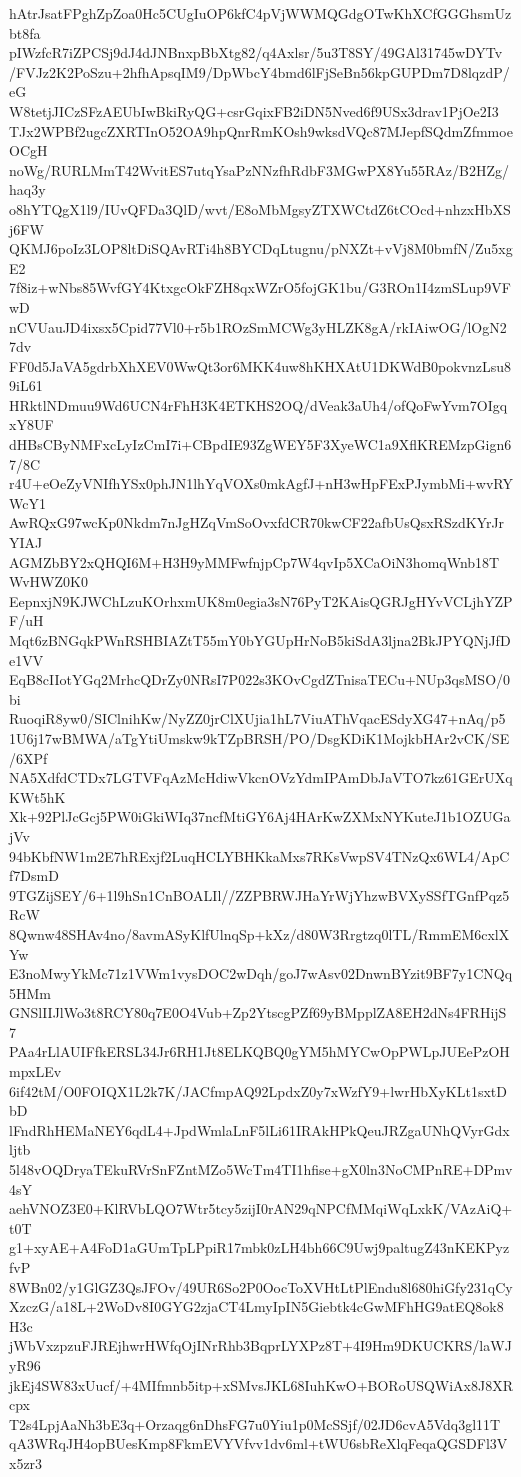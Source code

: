 hAtrJsatFPghZpZoa0Hc5CUgIuOP6kfC4pVjWWMQGdgOTwKhXCfGGGhsmUzbt8fa
pIWzfcR7iZPCSj9dJ4dJNBnxpBbXtg82/q4Axlsr/5u3T8SY/49GAl31745wDYTv
/FVJz2K2PoSzu+2hfhApsqIM9/DpWbcY4bmd6lFjSeBn56kpGUPDm7D8lqzdP/eG
W8tetjJICzSFzAEUbIwBkiRyQG+csrGqixFB2iDN5Nved6f9USx3drav1PjOe2I3
TJx2WPBf2ugcZXRTInO52OA9hpQnrRmKOsh9wksdVQc87MJepfSQdmZfmmoeOCgH
noWg/RURLMmT42WvitES7utqYsaPzNNzfhRdbF3MGwPX8Yu55RAz/B2HZg/haq3y
o8hYTQgX1l9/IUvQFDa3QlD/wvt/E8oMbMgsyZTXWCtdZ6tCOcd+nhzxHbXSj6FW
QKMJ6poIz3LOP8ltDiSQAvRTi4h8BYCDqLtugnu/pNXZt+vVj8M0bmfN/Zu5xgE2
7f8iz+wNbs85WvfGY4KtxgcOkFZH8qxWZrO5fojGK1bu/G3ROn1I4zmSLup9VFwD
nCVUauJD4ixsx5Cpid77Vl0+r5b1ROzSmMCWg3yHLZK8gA/rkIAiwOG/lOgN27dv
FF0d5JaVA5gdrbXhXEV0WwQt3or6MKK4uw8hKHXAtU1DKWdB0pokvnzLsu89iL61
HRktlNDmuu9Wd6UCN4rFhH3K4ETKHS2OQ/dVeak3aUh4/ofQoFwYvm7OIgqxY8UF
dHBsCByNMFxcLyIzCmI7i+CBpdIE93ZgWEY5F3XyeWC1a9XflKREMzpGign67/8C
r4U+eOeZyVNIfhYSx0phJN1lhYqVOXs0mkAgfJ+nH3wHpFExPJymbMi+wvRYWcY1
AwRQxG97wcKp0Nkdm7nJgHZqVmSoOvxfdCR70kwCF22afbUsQsxRSzdKYrJrYIAJ
AGMZbBY2xQHQI6M+H3H9yMMFwfnjpCp7W4qvIp5XCaOiN3homqWnb18TWvHWZ0K0
EepnxjN9KJWChLzuKOrhxmUK8m0egia3sN76PyT2KAisQGRJgHYvVCLjhYZPF/uH
Mqt6zBNGqkPWnRSHBIAZtT55mY0bYGUpHrNoB5kiSdA3ljna2BkJPYQNjJfDe1VV
EqB8cIIotYGq2MrhcQDrZy0NRsI7P022s3KOvCgdZTnisaTECu+NUp3qsMSO/0bi
RuoqiR8yw0/SIClnihKw/NyZZ0jrClXUjia1hL7ViuAThVqacESdyXG47+nAq/p5
1U6j17wBMWA/aTgYtiUmskw9kTZpBRSH/PO/DsgKDiK1MojkbHAr2vCK/SE/6XPf
NA5XdfdCTDx7LGTVFqAzMcHdiwVkcnOVzYdmIPAmDbJaVTO7kz61GErUXqKWt5hK
Xk+92PlJcGcj5PW0iGkiWIq37ncfMtiGY6Aj4HArKwZXMxNYKuteJ1b1OZUGajVv
94bKbfNW1m2E7hRExjf2LuqHCLYBHKkaMxs7RKsVwpSV4TNzQx6WL4/ApCf7DsmD
9TGZijSEY/6+1l9hSn1CnBOALIl//ZZPBRWJHaYrWjYhzwBVXySSfTGnfPqz5RcW
8Qwnw48SHAv4no/8avmASyKlfUlnqSp+kXz/d80W3Rrgtzq0lTL/RmmEM6cxlXYw
E3noMwyYkMc71z1VWm1vysDOC2wDqh/goJ7wAsv02DnwnBYzit9BF7y1CNQq5HMm
GNSlIIJlWo3t8RCY80q7E0O4Vub+Zp2YtscgPZf69yBMpplZA8EH2dNs4FRHijS7
PAa4rLlAUIFfkERSL34Jr6RH1Jt8ELKQBQ0gYM5hMYCwOpPWLpJUEePzOHmpxLEv
6if42tM/O0FOIQX1L2k7K/JACfmpAQ92LpdxZ0y7xWzfY9+lwrHbXyKLt1sxtDbD
lFndRhHEMaNEY6qdL4+JpdWmlaLnF5lLi61IRAkHPkQeuJRZgaUNhQVyrGdxljtb
5l48vOQDryaTEkuRVrSnFZntMZo5WcTm4TI1hfise+gX0ln3NoCMPnRE+DPmv4sY
aehVNOZ3E0+KlRVbLQO7Wtr5tcy5zijI0rAN29qNPCfMMqiWqLxkK/VAzAiQ+t0T
g1+xyAE+A4FoD1aGUmTpLPpiR17mbk0zLH4bh66C9Uwj9paltugZ43nKEKPyzfvP
8WBn02/y1GlGZ3QsJFOv/49UR6So2P0OocToXVHtLtPlEndu8l680hiGfy231qCy
XzczG/a18L+2WoDv8I0GYG2zjaCT4LmyIpIN5Giebtk4cGwMFhHG9atEQ8ok8H3c
jWbVxzpzuFJREjhwrHWfqOjINrRhb3BqprLYXPz8T+4I9Hm9DKUCKRS/laWJyR96
jkEj4SW83xUucf/+4MIfmnb5itp+xSMvsJKL68IuhKwO+BORoUSQWiAx8J8XRcpx
T2s4LpjAaNh3bE3q+Orzaqg6nDhsFG7u0Yiu1p0McSSjf/02JD6cvA5Vdq3gl11T
qA3WRqJH4opBUesKmp8FkmEVYVfvv1dv6ml+tWU6sbReXlqFeqaQGSDFl3Vx5zr3
